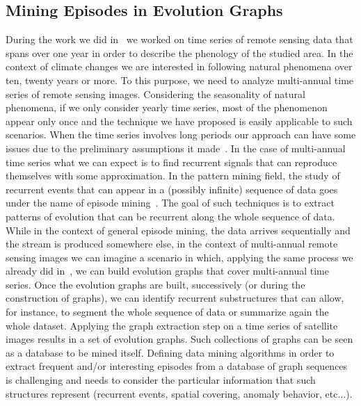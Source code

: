 \subsection{Mining Episodes in Evolution Graphs}
During the work we did in~\cite{GuttlerACINPT14,GuttlerITNP14} we worked on time series of remote sensing data that spans over one year in order to describe the phenology of the studied area. %
In the context of climate changes we are interested in following natural phenomena over ten, twenty years or more. To this purpose, we need to analyze multi-annual time series of remote sensing images. Considering the seasonality of natural phenomena, if we only consider yearly time series, most of the phenomenon appear only once and the technique we have proposed is easily applicable to such scenarios. When the time series involves long periods our approach can have some issues due to the preliminary assumptions it made~\cite{GuttlerACINPT14}.
In the case of multi-annual time series what we can expect is to find recurrent signals that can reproduce themselves with some approximation.
In the pattern mining field, the study of recurrent events that can appear in a (possibly infinite) sequence of data goes under the name of episode mining~\cite{WuLYT13}. The goal of such techniques is to extract patterns of evolution that can be recurrent along the whole sequence of data. While in the context of general episode mining, the data arrives sequentially and the stream is produced somewhere else, in the context of multi-annual remote sensing images we can imagine a scenario in which, applying the same process we already did in~\cite{GuttlerACINPT14}, we can build evolution graphs that cover multi-annual time series.
Once the evolution graphs are built, successively (or during the construction of graphs), we can identify recurrent substructures that can allow, for instance, to segment the whole sequence of data or summarize again the whole dataset.
Applying the graph extraction step on a time series of satellite images results in a set of evolution graphs. Such collections of graphs can be seen as a database to be mined itself. Defining data mining algorithms in order to extract frequent and/or interesting episodes from a database of graph sequences is challenging and needs to consider the particular information that such structures represent (recurrent events, spatial covering, anomaly behavior, etc...).


